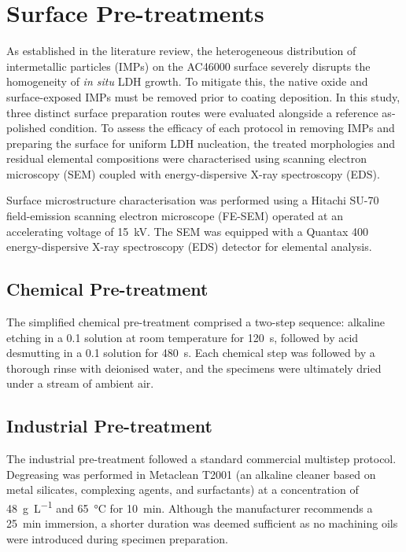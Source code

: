\documentclass[11pt,twoside,a4paper,final]{report}
\begin{document}
\newpage

\section{Surface Pre-treatments}
\label{sec:pretreatments}

As established in the literature review, the heterogeneous distribution of intermetallic particles (IMPs) on the AC46000 surface severely disrupts the homogeneity of \textit{in situ} LDH growth. To mitigate this, the native oxide and surface-exposed IMPs must be removed prior to coating deposition. In this study, three distinct surface preparation routes were evaluated alongside a reference as-polished condition. To assess the efficacy of each protocol in removing IMPs and preparing the surface for uniform LDH nucleation, the treated morphologies and residual elemental compositions were characterised using scanning electron microscopy (SEM) coupled with energy-dispersive X-ray spectroscopy (EDS).

Surface microstructure characterisation was performed using a Hitachi SU-70 field-emission scanning electron microscope (FE-SEM) operated at an accelerating voltage of \qty{15}{\kilo\volt}. The SEM was equipped with a Quantax 400 energy-dispersive X-ray spectroscopy (EDS) detector for elemental analysis.

\subsection{Chemical Pre-treatment}
\label{subsec:chemical_pretreatment}

The simplified chemical pre-treatment comprised a two-step sequence: alkaline etching in a \qty{0.1}{\molar}  solution at room temperature for \qty{120}{\second}, followed by acid desmutting in a \qty{0.1}{\molar}  solution for \qty{480}{\second}. Each chemical step was followed by a thorough rinse with deionised water, and the specimens were ultimately dried under a stream of ambient air.

\subsection{Industrial Pre-treatment}
\label{subsec:industrial_pretreatment}

The industrial pre-treatment followed a standard commercial multistep protocol. Degreasing was performed in Metaclean T2001 (an alkaline cleaner based on metal silicates, complexing agents, and surfactants) at a concentration of \qty{48}{\gram\per\liter} and \qty{65}{\degreeCelsius} for \qty{10}{\minute}. Although the manufacturer recommends a \qty{25}{\minute} immersion, a shorter duration was deemed sufficient as no machining oils were introduced during specimen preparation. 
\end{document}

